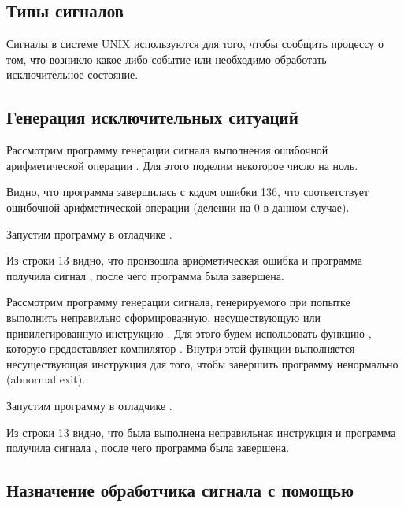 \subsection{Типы сигналов}

Сигналы в системе UNIX  используются для того, чтобы сообщить процессу о том, что возникло какое-либо событие или необходимо обработать исключительное состояние. 


\subsection{Генерация исключительных ситуаций}

Рассмотрим программу генерации сигнала выполнения ошибочной арифметической операции . Для этого поделим некоторое число на ноль.


Видно, что программа завершилась с кодом ошибки 136, что соответствует ошибочной арифметической операции (делении на 0 в данном случае).

Запустим программу  в отладчике .


Из строки 13 видно, что произошла арифметическая ошибка и программа получила сигнал , после чего программа была завершена.

Рассмотрим программу генерации сигнала, генерируемого при попытке выполнить неправильно сформированную, несуществующую или привилегированную инструкцию . Для этого будем использовать функцию , которую предоставляет компилятор . Внутри этой функции выполняется несуществующая инструкция для того, чтобы завершить программу ненормально (abnormal exit).


Запустим программу  в отладчике .


Из строки 13 видно, что была выполнена неправильная инструкция и программа получила сигнала , после чего программа была завершена.

\subsection{Назначение обработчика сигнала с помощью }

